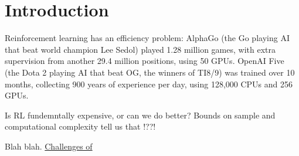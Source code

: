 \chapter{Introduction}\label{C:intro}

Reinforcement learning has an efficiency problem: AlphaGo \cite{Silver2016a} (the Go
playing AI that beat world champion Lee Sedol) played 1.28 million games, with
extra supervision from another 29.4 million positions, using 50 GPUs.
OpenAI Five \cite{OpenAI2018} (the Dota 2 playing AI that beat OG, the winners of TI8/9) was
trained over 10 months, collecting 900 years of experience per day, using
128,000 CPUs and 256 GPUs.

%
Is RL fundemntally expensive, or can we do better?
Bounds on sample and computational complexity tell us that !??!

%


Blah blah. \href{https://arxiv.org/abs/1904.12901}{Challenges of}

